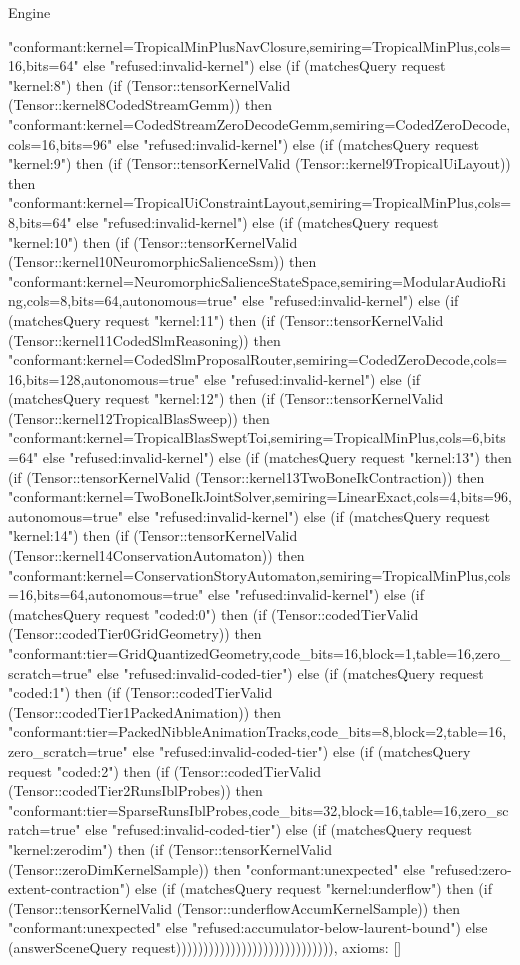 \begin{lexlean}{Engine}
\begin{semanticmodule}
{"conformant:kernel=TropicalMinPlusNavClosure,semiring=TropicalMinPlus,cols=16,bits=64" else "refused:invalid-kernel") else (if (matchesQuery request "kernel:8") then (if (Tensor::tensorKernelValid (Tensor::kernel8CodedStreamGemm)) then "conformant:kernel=CodedStreamZeroDecodeGemm,semiring=CodedZeroDecode,cols=16,bits=96" else "refused:invalid-kernel") else (if (matchesQuery request "kernel:9") then (if (Tensor::tensorKernelValid (Tensor::kernel9TropicalUiLayout)) then "conformant:kernel=TropicalUiConstraintLayout,semiring=TropicalMinPlus,cols=8,bits=64" else "refused:invalid-kernel") else (if (matchesQuery request "kernel:10") then (if (Tensor::tensorKernelValid (Tensor::kernel10NeuromorphicSalienceSsm)) then "conformant:kernel=NeuromorphicSalienceStateSpace,semiring=ModularAudioRing,cols=8,bits=64,autonomous=true" else "refused:invalid-kernel") else (if (matchesQuery request "kernel:11") then (if (Tensor::tensorKernelValid (Tensor::kernel11CodedSlmReasoning)) then "conformant:kernel=CodedSlmProposalRouter,semiring=CodedZeroDecode,cols=16,bits=128,autonomous=true" else "refused:invalid-kernel") else (if (matchesQuery request "kernel:12") then (if (Tensor::tensorKernelValid (Tensor::kernel12TropicalBlasSweep)) then "conformant:kernel=TropicalBlasSweptToi,semiring=TropicalMinPlus,cols=6,bits=64" else "refused:invalid-kernel") else (if (matchesQuery request "kernel:13") then (if (Tensor::tensorKernelValid (Tensor::kernel13TwoBoneIkContraction)) then "conformant:kernel=TwoBoneIkJointSolver,semiring=LinearExact,cols=4,bits=96,autonomous=true" else "refused:invalid-kernel") else (if (matchesQuery request "kernel:14") then (if (Tensor::tensorKernelValid (Tensor::kernel14ConservationAutomaton)) then "conformant:kernel=ConservationStoryAutomaton,semiring=TropicalMinPlus,cols=16,bits=64,autonomous=true" else "refused:invalid-kernel") else (if (matchesQuery request "coded:0") then (if (Tensor::codedTierValid (Tensor::codedTier0GridGeometry)) then "conformant:tier=GridQuantizedGeometry,code_bits=16,block=1,table=16,zero_scratch=true" else "refused:invalid-coded-tier") else (if (matchesQuery request "coded:1") then (if (Tensor::codedTierValid (Tensor::codedTier1PackedAnimation)) then "conformant:tier=PackedNibbleAnimationTracks,code_bits=8,block=2,table=16,zero_scratch=true" else "refused:invalid-coded-tier") else (if (matchesQuery request "coded:2") then (if (Tensor::codedTierValid (Tensor::codedTier2RunsIblProbes)) then "conformant:tier=SparseRunsIblProbes,code_bits=32,block=16,table=16,zero_scratch=true" else "refused:invalid-coded-tier") else (if (matchesQuery request "kernel:zerodim") then (if (Tensor::tensorKernelValid (Tensor::zeroDimKernelSample)) then "conformant:unexpected" else "refused:zero-extent-contraction") else (if (matchesQuery request "kernel:underflow") then (if (Tensor::tensorKernelValid (Tensor::underflowAccumKernelSample)) then "conformant:unexpected" else "refused:accumulator-below-laurent-bound") else (answerSceneQuery request))))))))))))))))))))))))))))),
  axioms: []
}


\end{semanticmodule}
\end{lexlean}
